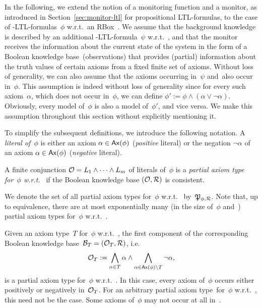 In the following, we extend the notion of a monitoring function and a monitor,
as introduced in Section~\ref{sec:monitor-ltl} for propositional LTL-formulas,
to the case of \SHOQ-LTL-formulas~$\phi$ w.r.t.\ an RBox~\Rmc.  We assume that
the background knowledge is described by an additional \SHOQ-LTL-formula~$\psi$
w.r.t.~\Rmc, and that the monitor receives the information about the current
state of the system in the form of a Boolean knowledge base~\Omc (observations)
that provides (partial) information about the truth values of certain axioms
from a fixed finite set of axioms.  Without loss of generality, we can also
assume that the axioms occurring in~$\psi$ and~\Omc also occur in~$\phi$.  This
assumption is indeed without loss of generality since for every such
axiom~$\alpha$, which does not occur in~$\phi$, we can define
$\phi':=\phi\land(\alpha\lor\lnot\alpha)$.  Obviously, every model of~$\phi$ is
also a model of~$\phi'$, and vice versa.  We make this assumption throughout
this section without explicitly mentioning it.

To simplify the subsequent definitions, we introduce the following notation.  A
\emph{literal of~$\phi$} is either an axiom $\alpha\in\operatorname{\mathsf{Ax}}(\phi)$
(\emph{positive} literal) or the negation $\lnot\alpha$ of an axiom
$\alpha\in \operatorname{\mathsf{Ax}}(\phi)$ (\emph{negative} literal).

\begin{definition}
    A finite conjunction $\mathcal{O}=L_1\land\dots\land L_m$ of literals of~$\phi$ is
    a \emph{partial axiom type for~$\phi$ w.r.t.~\Rmc} if the Boolean knowledge
    base $(\mathcal{O},\mathcal{R})$ is consistent.
\end{definition}

\noindent
We denote the set of all partial axiom types for~$\phi$ w.r.t.~\Rmc
by~$\mathfrak{P}_{\phi,\mathcal{R}}$.
%
Note that, up to equivalence, there are at most exponentially many (in the size
of~$\phi$ and~\Rmc) partial axiom types for~$\phi$ w.r.t.~\Rmc.

Given an axiom type~$T$ for~$\phi$ w.r.t.~\Rmc, the first component of the
corresponding Boolean knowledge base~$\mathcal{B}_T=(\mathcal{O}_T,\mathcal{R})$, i.e.\
\[\mathcal{O}_T:=\bigwedge_{\alpha\in T}\alpha\land\bigwedge_{\alpha\in\operatorname{\mathsf{Ax}}(\phi)\setminus T}\lnot\alpha,\]
is a partial axiom type for~$\phi$ w.r.t.~\Rmc.  In this case, every axiom
of~$\phi$ occurs either positively or negatively in~$\mathcal{O}_T$.  For an arbitrary
partial axiom type~\Omc for~$\phi$ w.r.t.~\Rmc, this need not be the case.  Some
axioms of~$\phi$ may not occur at all in~\Omc.

